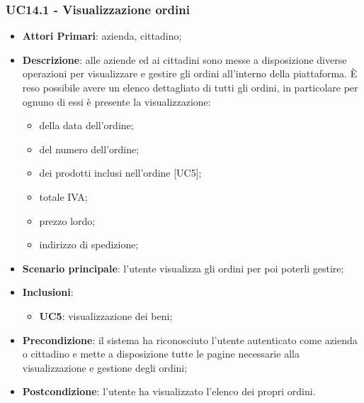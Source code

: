 \subsubsection{UC14.1 - Visualizzazione ordini}
\begin{itemize}
	\item \textbf{Attori Primari}: azienda, cittadino;
	\item \textbf{Descrizione}: alle aziende ed ai cittadini sono messe a disposizione diverse operazioni per visualizzare e gestire gli ordini all'interno della piattaforma. \`E reso possibile avere un elenco dettagliato di tutti gli ordini, in particolare per ognuno di essi è presente la visualizzazione:
	\begin{itemize}
		\item della data dell'ordine;
		\item del numero dell'ordine;
		\item dei prodotti inclusi nell'ordine [UC5];
		\item totale IVA;
		\item prezzo lordo\glo;
		\item indirizzo di spedizione;
	\end{itemize}
	\item \textbf{Scenario principale}: l'utente visualizza gli ordini per poi poterli gestire;
	\item \textbf{Inclusioni}:
	\begin{itemize}
		\item \textbf{UC5}: visualizzazione dei beni;
	\end{itemize}
	\item \textbf{Precondizione}: il sistema ha riconosciuto l'utente autenticato come azienda o cittadino e mette a disposizione tutte le pagine necessarie alla visualizzazione e gestione degli ordini;
	\item \textbf{Postcondizione}: l'utente ha visualizzato l'elenco dei propri ordini.
\end{itemize} 

